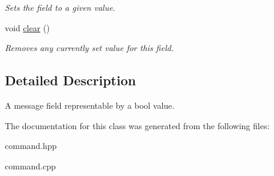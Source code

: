 \begin{DoxyCompactItemize}
\begin{DoxyCompactList}\small\item\em Sets the field to a given value. \end{DoxyCompactList}\item 
\mbox{\label{classhebi_1_1Command_1_1BoolField_ae716d99d8f178bbca09867b46207b484}} 
void \hyperlink{classhebi_1_1Command_1_1BoolField_ae716d99d8f178bbca09867b46207b484}{clear} ()
\begin{DoxyCompactList}\small\item\em Removes any currently set value for this field. \end{DoxyCompactList}\end{DoxyCompactItemize}


\subsection{Detailed Description}
A message field representable by a bool value. 

The documentation for this class was generated from the following files\+:\begin{DoxyCompactItemize}
\item 
command.\+hpp\item 
command.\+cpp\end{DoxyCompactItemize}
